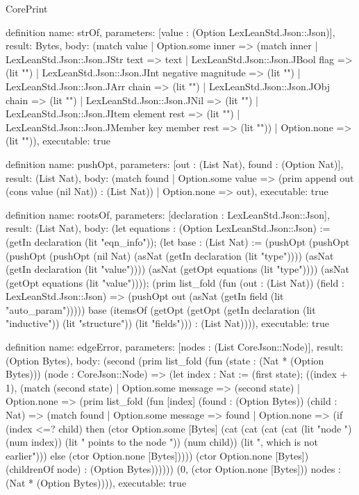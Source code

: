 \begin{lexlean}{CorePrint}
\begin{semanticmodule}
definition{
  name: strOf,
  parameters: [value : (Option LexLeanStd.Json::Json)],
  result: Bytes,
  body: (match value
    | Option.some inner => (match inner
      | LexLeanStd.Json::Json.JStr text => text
      | LexLeanStd.Json::Json.JBool flag => (lit "")
      | LexLeanStd.Json::Json.JInt negative magnitude => (lit "")
      | LexLeanStd.Json::Json.JArr chain => (lit "")
      | LexLeanStd.Json::Json.JObj chain => (lit "")
      | LexLeanStd.Json::Json.JNil => (lit "")
      | LexLeanStd.Json::Json.JItem element rest => (lit "")
      | LexLeanStd.Json::Json.JMember key member rest => (lit ""))
    | Option.none => (lit "")),
  executable: true
}

definition{
  name: pushOpt,
  parameters: [out : (List Nat), found : (Option Nat)],
  result: (List Nat),
  body: (match found
    | Option.some value => (prim append out (cons value (nil Nat)) : (List Nat))
    | Option.none => out),
  executable: true
}

definition{
  name: rootsOf,
  parameters: [declaration : LexLeanStd.Json::Json],
  result: (List Nat),
  body: (let equations : (Option LexLeanStd.Json::Json) := (getIn declaration (lit "eqn_info")); (let base : (List Nat) := (pushOpt (pushOpt (pushOpt (pushOpt (nil Nat) (asNat (getIn declaration (lit "type")))) (asNat (getIn declaration (lit "value")))) (asNat (getOpt equations (lit "type")))) (asNat (getOpt equations (lit "value")))); (prim list_fold (fun (out : (List Nat)) (field : LexLeanStd.Json::Json) => (pushOpt out (asNat (getIn field (lit "auto_param"))))) base (itemsOf (getOpt (getOpt (getIn declaration (lit "inductive")) (lit "structure")) (lit "fields"))) : (List Nat)))),
  executable: true
}

definition{
  name: edgeError,
  parameters: [nodes : (List CoreJson::Node)],
  result: (Option Bytes),
  body: (second (prim list_fold (fun (state : (Nat * (Option Bytes))) (node : CoreJson::Node) => (let index : Nat := (first state); ((index + 1), (match (second state)
    | Option.some message => (second state)
    | Option.none => (prim list_fold (fun [index] (found : (Option Bytes)) (child : Nat) => (match found
      | Option.some message => found
      | Option.none => (if (index <=? child) then (ctor Option.some [Bytes] (cat (cat (cat (cat (lit "node ") (num index)) (lit " points to the node ")) (num child)) (lit ", which is not earlier"))) else (ctor Option.none [Bytes])))) (ctor Option.none [Bytes]) (childrenOf node) : (Option Bytes)))))) (0, (ctor Option.none [Bytes])) nodes : (Nat * (Option Bytes)))),
  executable: true
}


\end{semanticmodule}
\end{lexlean}
